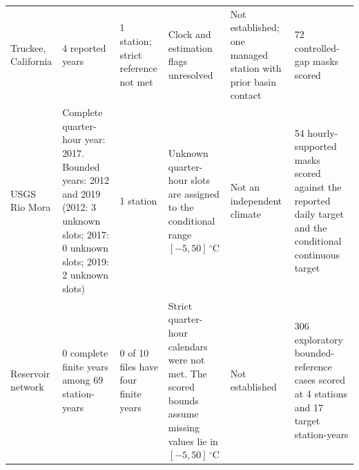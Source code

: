 \begin{table}[p]
\begin{tabular}{@{}p{}p{}p{}p{}p{}p{}@{}}
Truckee, California & 4 reported years & 1 station; strict reference not met & Clock and estimation flags unresolved & Not established; one managed station with prior basin contact & 72 controlled-gap masks scored \\
USGS Rio Mora & Complete quarter-hour year: 2017. Bounded years: 2012 and 2019 (2012: 3 unknown slots; 2017: 0 unknown slots; 2019: 2 unknown slots) & 1 station & Unknown quarter-hour slots are assigned to the conditional range $[-5,50]\,^{\circ}$C & Not an independent climate & 54 hourly-supported masks scored against the reported daily target and the conditional continuous target \\
Reservoir network & 0 complete finite years among 69 station-years & 0 of 10 files have four finite years & Strict quarter-hour calendars were not met. The scored bounds assume missing values lie in $[-5,50]\,^{\circ}$C & Not established & 306 exploratory bounded-reference cases scored at 4 stations and 17 target station-years \\
\bottomrule
\end{tabular}
\end{table}
